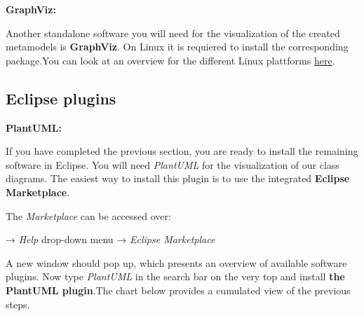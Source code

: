 \textbf{GraphViz:}

Another standalone software you will need for the visualization of the created metamodels is \textbf{GraphViz}. On Linux it is requiered to install the corresponding package.\newline You can look at an overview for the different Linux plattforms \href{https://graphviz.org/download/}{\underline{here}}.

\clearpage

\subsection{Eclipse plugins}

\textbf{PlantUML:}

If you have completed the previous section, you are ready to install the remaining software in Eclipse. You will need \textsf{\textit{PlantUML}} for the visualization of our class diagrams. The easiest way to install this plugin is to use the integrated \textbf{Eclipse Marketplace}.

The \textsf{\textit{Marketplace}} can be accessed over:\newline

\centering
→ \textsf{\textit{Help}} drop-down menu →
\textsf{\textit{Eclipse Marketplace}}\newline

\raggedright
A new window should pop up, which presents an overview of available software plugins. Now type \textit{\textsf{PlantUML}} in the search bar on the very top and install \textbf{the PlantUML plugin}.The chart below provides a cumulated view of the previous steps.\newline\newline

